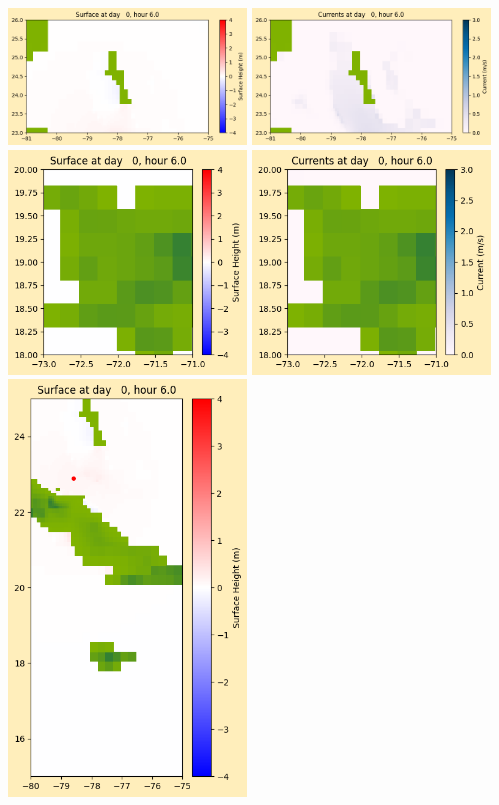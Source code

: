 \documentclass[11pt]{article}
\begin{document}
\vskip 10pt 
\includegraphics[width=0.475\textwidth]{frame0013fig1003.png}
\includegraphics[width=0.475\textwidth]{frame0013fig1004.png}
\vskip 10pt 
\includegraphics[width=0.475\textwidth]{frame0013fig1005.png}
\includegraphics[width=0.475\textwidth]{frame0013fig1006.png}
\vskip 10pt 
\includegraphics[width=0.475\textwidth]{frame0013fig1007.png}
\end{document}
